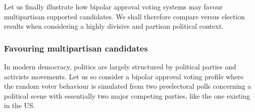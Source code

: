 \documentclass[a4paper,12pt,english]{sphinxhowto}
\begin{document}
\sphinxAtStartPar
Let us finally illustrate how bipolar approval voting systems may favour multipartisan supported candidates. We shall therefore compare  versus  election results when considering a highly divisive and partisan political context.


\subsubsection{Favouring multipartisan candidates}
\label{\detokenize{pearls:favouring-multipartisan-candidates}}
\sphinxAtStartPar
In modern democracy, politics  are largely structured by political parties and activists movements. Let us so consider a bipolar approval voting profile  where the random voter behaviour is simulated from two pre\sphinxhyphen{}electoral polls concerning a political scene with essentially two major competing parties, like the one existing in the US.
\end{document}
